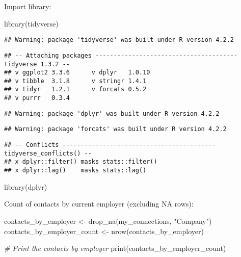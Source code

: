 \documentclass[
]{article}
\newenvironment{Shaded}{\begin{snugshade}}{\end{snugshade}}
\newcommand{\CommentTok}[1]{\textcolor[rgb]{0.56,0.35,0.01}{\textit{#1}}}
\newcommand{\FunctionTok}[1]{\textcolor[rgb]{0.00,0.00,0.00}{#1}}
\newcommand{\NormalTok}[1]{#1}
\newcommand{\OtherTok}[1]{\textcolor[rgb]{0.56,0.35,0.01}{#1}}
\newcommand{\StringTok}[1]{\textcolor[rgb]{0.31,0.60,0.02}{#1}}
\begin{document}
Import library:

\begin{Shaded}
\begin{Highlighting}[]
\FunctionTok{library}\NormalTok{(tidyverse)}
\end{Highlighting}
\end{Shaded}

\begin{verbatim}
## Warning: package 'tidyverse' was built under R version 4.2.2
\end{verbatim}

\begin{verbatim}
## -- Attaching packages --------------------------------------- tidyverse 1.3.2 --
## v ggplot2 3.3.6      v dplyr   1.0.10
## v tibble  3.1.8      v stringr 1.4.1 
## v tidyr   1.2.1      v forcats 0.5.2 
## v purrr   0.3.4
\end{verbatim}

\begin{verbatim}
## Warning: package 'dplyr' was built under R version 4.2.2
\end{verbatim}

\begin{verbatim}
## Warning: package 'forcats' was built under R version 4.2.2
\end{verbatim}

\begin{verbatim}
## -- Conflicts ------------------------------------------ tidyverse_conflicts() --
## x dplyr::filter() masks stats::filter()
## x dplyr::lag()    masks stats::lag()
\end{verbatim}

\begin{Shaded}
\begin{Highlighting}[]
\FunctionTok{library}\NormalTok{(dplyr)}
\end{Highlighting}
\end{Shaded}

Count of contacts by current employer (excluding NA rows):

\begin{Shaded}
\begin{Highlighting}[]
\NormalTok{contacts\_by\_employer }\OtherTok{\textless{}{-}} \FunctionTok{drop\_na}\NormalTok{(my\_connections, }\StringTok{"Company"}\NormalTok{)}
\NormalTok{contacts\_by\_employer\_count }\OtherTok{\textless{}{-}} \FunctionTok{nrow}\NormalTok{(contacts\_by\_employer)}

\CommentTok{\# Print the contacts by employer}
\FunctionTok{print}\NormalTok{(contacts\_by\_employer\_count)}
\end{Highlighting}
\end{Shaded}
\end{document}
